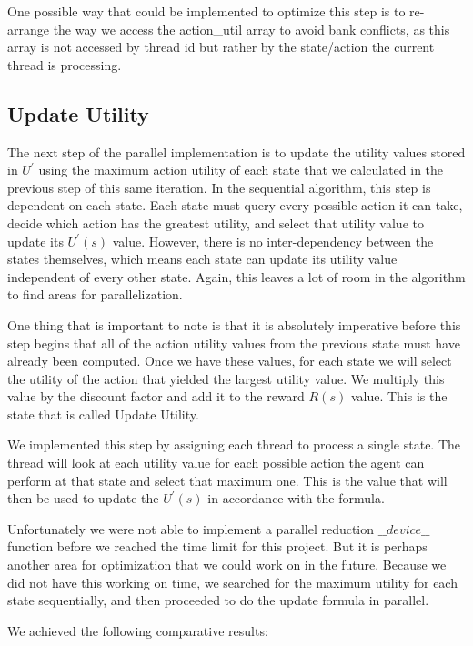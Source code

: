 \documentclass[letterpaper,twocolumn,10pt]{article}
\begin{document}
{One possible way that could be implemented to optimize this step is to re-arrange the way we access the action\_util array to avoid bank conflicts, as this array is not accessed by thread id but rather by the state/action the current thread is processing.

\subsection{Update Utility}

The next step of the parallel implementation is to update the utility values stored in $U^\prime$ using the maximum action utility of each state that we calculated in the previous step of this same iteration. In the sequential algorithm, this step is dependent on each state. Each state must query every possible action it can take, decide which action has the greatest utility, and select that utility value to update its $U^\prime(s)$ value. However, there is no inter-dependency between the states themselves, which means each state can update its utility value independent of every other state. Again, this leaves a lot of room in the algorithm to find areas for parallelization.

One thing that is important to note is that it is absolutely imperative before this step begins that all of the action utility values from the previous state must have already been computed. Once we have these values, for each state we will select the utility of the action that yielded the largest utility value. We multiply this value by the discount factor and add it to the reward $R(s)$ value. This is the state that is called Update Utility.

We implemented this step by assigning each thread to process a single state. The thread will look at each utility value for each possible action the agent can perform at that state and select that maximum one. This is the value that will then be used to update the $U^\prime(s)$ in accordance with the formula.

Unfortunately we were not able to implement a parallel reduction $\_\_device\_\_$ function before we reached the time limit for this project. But it is perhaps another area for optimization that we could work on in the future. Because we did not have this working on time, we searched for the maximum utility for each state sequentially, and then proceeded to do the update formula in parallel.

We achieved the following comparative results:

}
\end{document}

